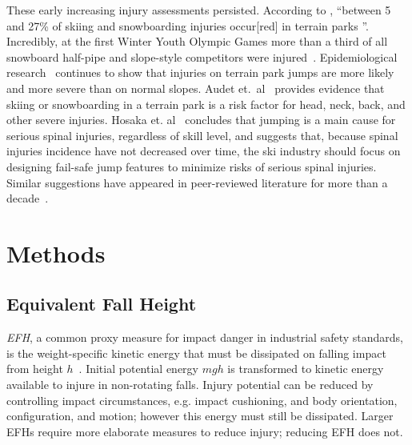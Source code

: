 \documentclass{article}
\begin{document}
These early increasing injury assessments persisted. According to
\cite{Russell2014}, ``between 5 and 27\% of skiing and snowboarding injuries
occur[red] in terrain parks
\cite{Bridges2003,Goulet2007,Moffat2009,Greve2009,Brooks2010,Ruedl2013}''.
Incredibly, at the first Winter Youth Olympic Games more than a third of all
snowboard half-pipe and slope-style competitors were injured~\cite{Ruedl2012}.
Epidemiological research~\cite{Carus2016,Audet2020,Hosaka2020} continues to
show that injuries on terrain park jumps are more likely and more severe than
on normal slopes. Audet et.~al~\cite{Audet2020} provides evidence that skiing
or snowboarding in a terrain park is a risk factor for head, neck, back, and
other severe injuries. Hosaka et. al~\cite{Hosaka2020} concludes that jumping
is a main cause for serious spinal injuries, regardless of skill level, and
suggests that, because spinal injuries incidence  have not decreased over time,
the ski industry should focus on designing fail-safe jump features to minimize
risks of serious spinal injuries. Similar suggestions have appeared in
peer-reviewed literature for more than a
decade~\cite{Hubbard2009,Swedberg2012,Hubbard2012,McNeil2012,McNeil2012a,Hubbard2015,Levy2015,Petrone2017,Moore2018}.

\section{Methods}
\subsection{Equivalent Fall Height}
\label{sec:efh}
%
\emph{EFH}, a common proxy measure for impact danger in industrial safety
standards, is the weight-specific kinetic energy that must be dissipated on
falling impact from height $h$~\cite{Muller1995,Hubbard2009,Gasser2018}.
Initial potential energy $mgh$ is transformed to kinetic energy available to
injure in non-rotating falls. Injury potential can be reduced by controlling
impact circumstances, e.g. impact cushioning, and body orientation,
configuration, and motion; however this energy must still be dissipated. Larger
EFHs require more elaborate measures to reduce injury; reducing EFH does not.
\end{document}
